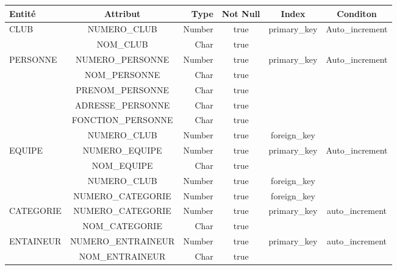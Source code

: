   
\begin{center}
\begin{tabular}{|l|c|r|c|c|c|} 
   \hline
    Entité & Attribut & Type & Not Null & Index & Conditon  \\
    \hline
    \hline
    CLUB & NUMERO\_CLUB & Number & true & primary\_key & Auto\_increment  \\
    \cline{2-6} 
        & NOM\_CLUB & Char& true & &  \\
    \hline
    \hline
    PERSONNE & NUMERO\_PERSONNE & Number & true & primary\_key & Auto\_increment \\
    \cline{2-6}
    & NOM\_PERSONNE & Char & true & & \\
    \cline{2-6}
    & PRENOM\_PERSONNE & Char & true & &\\
    \cline{2-6}
    & ADRESSE\_PERSONNE & Char & true & & \\
    \cline{2-6}
    & FONCTION\_PERSONNE & Char & true & & \\
    \cline{2-6}
    & NUMERO\_CLUB & Number & true & foreign\_key & \\
    \hline
    \hline
    EQUIPE & NUMERO\_EQUIPE & Number & true & primary\_key & Auto\_increment \\
    \cline{2-6}
    & NOM\_EQUIPE & Char & true & & \\
    \cline{2-6}
    & NUMERO\_CLUB & Number & true & foreign\_key &\\
    \cline{2-6}\cline{2-6}
    & NUMERO\_CATEGORIE & Number & true & foreign\_key & \\
    \hline
    \hline
    CATEGORIE & NUMERO\_CATEGORIE & Number & true & primary\_key & auto\_increment \\
    \cline{2-6}
    &NOM\_CATEGORIE & Char & true & & \\
    \hline
    \hline
    ENTAINEUR & NUMERO\_ENTRAINEUR & Number & true & primary\_key & auto\_increment\\
    \cline{2-6}
    & NOM\_ENTRAINEUR & Char & true &  & \\

\end{tabular}
\end{center}
